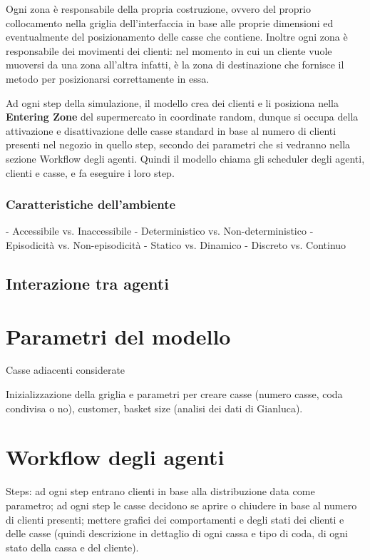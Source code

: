 Ogni zona è responsabile della propria costruzione, ovvero del proprio collocamento nella griglia dell'interfaccia in base alle proprie dimensioni ed eventualmente del posizionamento delle casse che contiene. Inoltre ogni zona è responsabile dei movimenti dei clienti: nel momento in cui un cliente vuole muoversi da una zona all'altra infatti, è la zona di destinazione che fornisce il metodo per posizionarsi correttamente in essa.

 Ad ogni step della simulazione, il modello crea dei clienti e li posiziona nella \textbf{Entering Zone} del supermercato in coordinate random, dunque si occupa della attivazione e disattivazione delle casse standard in base al numero di clienti presenti nel negozio in quello step, secondo dei parametri che si vedranno nella sezione  Workflow degli agenti. Quindi il modello chiama gli scheduler degli agenti, clienti e casse, e fa eseguire i loro step.

\subsubsection{Caratteristiche dell'ambiente}
- Accessibile vs. Inaccessibile
- Deterministico vs. Non-deterministico
- Episodicità vs. Non-episodicità
- Statico vs. Dinamico
- Discreto vs. Continuo

\subsection{Interazione tra agenti}

\section{Parametri del modello}
\label{model:parameters}

Casse adiacenti considerate

Inizializzazione della griglia e parametri per creare casse (numero casse, coda condivisa o no), customer, basket size (analisi dei dati di Gianluca).

\section{Workflow degli agenti}

Steps: ad ogni step entrano clienti in base alla distribuzione data come parametro; ad ogni step le casse decidono se aprire o chiudere in base al numero di clienti presenti; mettere grafici dei comportamenti e degli stati dei clienti e delle casse (quindi descrizione in dettaglio di ogni cassa e tipo di coda, di ogni stato della cassa e del cliente).